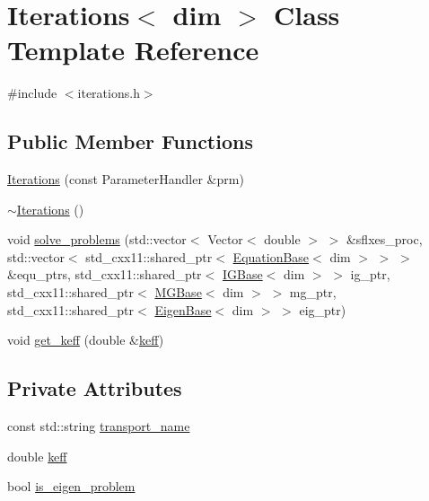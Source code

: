 \hypertarget{class_iterations}{}\section{Iterations$<$ dim $>$ Class Template Reference}
\label{class_iterations}


{\ttfamily \#include $<$iterations.\+h$>$}

\subsection*{Public Member Functions}
\begin{DoxyCompactItemize}
\item 
\hyperlink{class_iterations_a0355678383cd174840beb772ce7e9e8d}{Iterations} (const Parameter\+Handler \&prm)
\item 
\hyperlink{class_iterations_ae6ea082615afe8919000b4ea1465f9cf}{$\sim$\+Iterations} ()
\item 
void \hyperlink{class_iterations_ae41347e35b05b6f0fd3cb2a03ab60341}{solve\+\_\+problems} (std\+::vector$<$ Vector$<$ double $>$ $>$ \&sflxes\+\_\+proc, std\+::vector$<$ std\+\_\+cxx11\+::shared\+\_\+ptr$<$ \hyperlink{class_equation_base}{Equation\+Base}$<$ dim $>$ $>$ $>$ \&equ\+\_\+ptrs, std\+\_\+cxx11\+::shared\+\_\+ptr$<$ \hyperlink{class_i_g_base}{I\+G\+Base}$<$ dim $>$ $>$ ig\+\_\+ptr, std\+\_\+cxx11\+::shared\+\_\+ptr$<$ \hyperlink{class_m_g_base}{M\+G\+Base}$<$ dim $>$ $>$ mg\+\_\+ptr, std\+\_\+cxx11\+::shared\+\_\+ptr$<$ \hyperlink{class_eigen_base}{Eigen\+Base}$<$ dim $>$ $>$ eig\+\_\+ptr)
\item 
void \hyperlink{class_iterations_ae80aa8efae880a81421502dfdf1a7466}{get\+\_\+keff} (double \&\hyperlink{class_iterations_a4c36c8bdd6775be8015ef113c68a1e66}{keff})
\end{DoxyCompactItemize}
\subsection*{Private Attributes}
\begin{DoxyCompactItemize}
\item 
const std\+::string \hyperlink{class_iterations_a3a29339b09351ffa95e9c99be5d5e575}{transport\+\_\+name}
\item 
double \hyperlink{class_iterations_a4c36c8bdd6775be8015ef113c68a1e66}{keff}
\item 
bool \hyperlink{class_iterations_acfd49ecddab96b70fc271942b3173ad7}{is\+\_\+eigen\+\_\+problem}
\end{DoxyCompactItemize}


